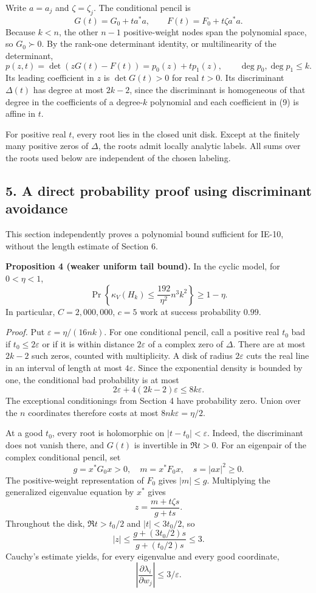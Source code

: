 \documentclass[
  11pt,
]{article}
\begin{document}
Write \(a=a_j\) and \(\zeta=\zeta_j\). The conditional pencil is \[
G(t)=G_0+ta^*a,\qquad F(t)=F_0+t\zeta a^*a.
\] Because \(k<n\), the other \(n-1\) positive-weight nodes span the
polynomial space, so \(G_0\succ0\). By the rank-one determinant
identity, or multilinearity of the determinant, \[
p(z,t)=\det(zG(t)-F(t))=p_0(z)+tp_1(z),\qquad
\deg p_0,\deg p_1\leq k. \tag{9}
\] Its leading coefficient in \(z\) is \(\det G(t)>0\) for real \(t>0\).
Its discriminant \(\Delta(t)\) has degree at most \(2k-2\), since the
discriminant is homogeneous of that degree in the coefficients of a
degree-\(k\) polynomial and each coefficient in (9) is affine in \(t\).

For positive real \(t\), every root lies in the closed unit disk. Except
at the finitely many positive zeros of \(\Delta\), the roots admit
locally analytic labels. All sums over the roots used below are
independent of the chosen labeling.

\subsection{5. A direct probability proof using discriminant
avoidance}\label{a-direct-probability-proof-using-discriminant-avoidance}

This section independently proves a polynomial bound sufficient for
IE-10, without the length estimate of Section 6.

\textbf{Proposition 4 (weaker uniform tail bound).} In the cyclic model,
for \(0<\eta<1\), \[
\Pr\left\{\kappa_V(H_k)\leq\frac{192}{\eta^2}n^3k^2\right\}\geq1-\eta. \tag{10}
\] In particular, \(C=2{,}000{,}000\), \(c=5\) work at success
probability \(0.99\).

\emph{Proof.} Put \(\varepsilon=\eta/(16nk)\). For one conditional
pencil, call a positive real \(t_0\) bad if \(t_0\leq2\varepsilon\) or
if it is within distance \(2\varepsilon\) of a complex zero of
\(\Delta\). There are at most \(2k-2\) such zeros, counted with
multiplicity. A disk of radius \(2\varepsilon\) cuts the real line in an
interval of length at most \(4\varepsilon\). Since the exponential
density is bounded by one, the conditional bad probability is at most \[
2\varepsilon+4(2k-2)\varepsilon\leq8k\varepsilon.
\] The exceptional conditionings from Section 4 have probability zero.
Union over the \(n\) coordinates therefore costs at most
\(8nk\varepsilon=\eta/2\).

At a good \(t_0\), every root is holomorphic on \(|t-t_0|<\varepsilon\).
Indeed, the discriminant does not vanish there, and \(G(t)\) is
invertible in \(\Re t>0\). For an eigenpair of the complex conditional
pencil, set \[
g=x^*G_0x>0,\quad m=x^*F_0x,\quad s=|ax|^2\geq0.
\] The positive-weight representation of \(F_0\) gives \(|m|\leq g\).
Multiplying the generalized eigenvalue equation by \(x^*\) gives \[
z=\frac{m+t\zeta s}{g+ts}.
\] Throughout the disk, \(\Re t>t_0/2\) and \(|t|<3t_0/2\), so \[
|z|\leq\frac{g+(3t_0/2)s}{g+(t_0/2)s}\leq3.
\] Cauchy's estimate yields, for every eigenvalue and every good
coordinate, \[
\left|\frac{\partial\lambda_i}{\partial w_j}\right|\leq3/\varepsilon. \tag{11}
\]
\end{document}
